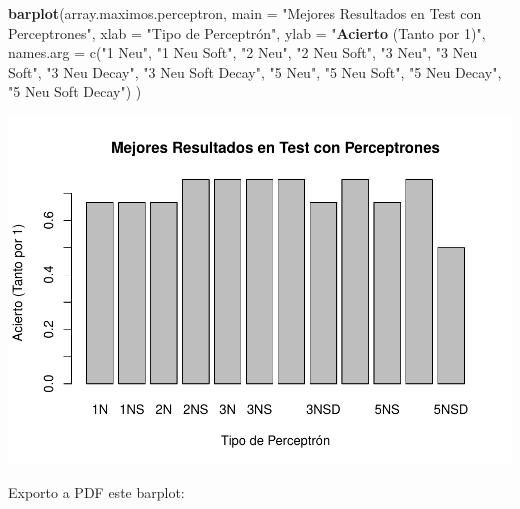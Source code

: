 \documentclass[]{article}
\newenvironment{Shaded}{\begin{snugshade}}{\end{snugshade}}
\newcommand{\KeywordTok}[1]{\textcolor[rgb]{0.13,0.29,0.53}{\textbf{#1}}}
\newcommand{\DataTypeTok}[1]{\textcolor[rgb]{0.13,0.29,0.53}{#1}}
\newcommand{\DecValTok}[1]{\textcolor[rgb]{0.00,0.00,0.81}{#1}}
\newcommand{\StringTok}[1]{\textcolor[rgb]{0.31,0.60,0.02}{#1}}
\newcommand{\NormalTok}[1]{#1}
\begin{document}
\begin{Shaded}
\begin{Highlighting}[]
\KeywordTok{barplot}\NormalTok{(array.maximos.perceptron,}
        \DataTypeTok{main =} \StringTok{"Mejores Resultados en Test con Perceptrones"}\NormalTok{,}
        \DataTypeTok{xlab =} \StringTok{"Tipo de Perceptrón",}
\StringTok{        ylab = "}\KeywordTok{Acierto}\NormalTok{ (Tanto por }\DecValTok{1}\NormalTok{)}\StringTok{",}
\StringTok{        names.arg = c("}\DecValTok{1}\NormalTok{ Neu}\StringTok{", "}\DecValTok{1}\NormalTok{ Neu Soft}\StringTok{", }
\StringTok{                      "}\DecValTok{2}\NormalTok{ Neu}\StringTok{", "}\DecValTok{2}\NormalTok{ Neu Soft}\StringTok{", }
\StringTok{                      "}\DecValTok{3}\NormalTok{ Neu}\StringTok{", "}\DecValTok{3}\NormalTok{ Neu Soft}\StringTok{", "}\DecValTok{3}\NormalTok{ Neu Decay}\StringTok{", "}\DecValTok{3}\NormalTok{ Neu Soft Decay}\StringTok{", }
\StringTok{                      "}\DecValTok{5}\NormalTok{ Neu}\StringTok{", "}\DecValTok{5}\NormalTok{ Neu Soft}\StringTok{", "}\DecValTok{5}\NormalTok{ Neu Decay}\StringTok{", "}\DecValTok{5}\NormalTok{ Neu Soft Decay}\StringTok{")}
\StringTok{      )}
\end{Highlighting}
\end{Shaded}

\includegraphics{codigo_files/figure-latex/analisis_resultados_perceptron-1.pdf}

Exporto a PDF este barplot:
\end{document}

